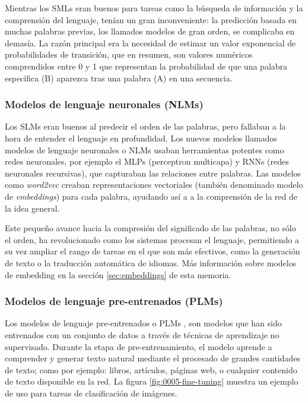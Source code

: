             \noindent Mientras los SMLs eran buenos para tareas como la búsqueda de información y la comprensión del lenguaje, tenían un gran inconveniente: la predicción basada en muchas palabras previas, los llamados modelos de gran orden, se complicaba en demasía. La razón principal era la necesidad de estimar un valor exponencial de probabilidades de transición, que en resumen, son valores numéricos comprendidos entre 0 y 1 que representan la probabilidad de que una palabra específica (B) aparezca tras una palabra (A) en una secuencia. 
        
        \subsubsection{Modelos de lenguaje neuronales (NLMs)}
        
            Los SLMs eran buenos al predecir el orden de las palabras, pero fallaban a la hora de entender el lenguaje en profundidad. Los nuevos modelos llamados modelos de lenguaje neuronales o NLMs \cite{0005_journeyLLM} usaban herramientas potentes como redes neuronales, por ejemplo el MLPs (perceptron multicapa) y RNNs (redes neuronales recursivas), que capturaban las relaciones entre palabras. Las modelos como \textit{word2vec} \cite{zhao2025surveylargelanguagemodels} creaban representaciones vectoriales (también denominado modelo de \textit{embeddings}) para cada palabra, ayudando así a a la comprensión de la red de la idea general. 
            
            \noindent Este pequeño avance hacia la compresión del significado de las palabras, no sólo el orden, ha revolucionado como los sistemas procesan el lenguaje, permitiendo a su vez ampliar el rango de tareas en el que son más efectivos, como la generación de texto o la traducción automática de idiomas. Más información sobre modelos de embedding en la sección \ref{sec:embeddings} de esta memoria.
            
        \subsubsection{Modelos de lenguaje pre-entrenados (PLMs)}
        
            Los modelos de lenguaje pre-entrenados o PLMs \cite{0005_journeyLLM}, son modelos que han sido entrenados con un conjunto de datos a través de técnicas de aprendizaje no supervisado. Durante la etapa de pre-entrenamiento, el modelo aprende a comprender y generar texto natural mediante el procesado de grandes cantidades de texto; como por ejemplo: libros, artículos, páginas web, o cualquier contenido de texto disponible en la red. La figura \ref{fig:0005-fine-tuning} muestra un ejemplo de uso para tareas de clasificación de imágenes.
            
